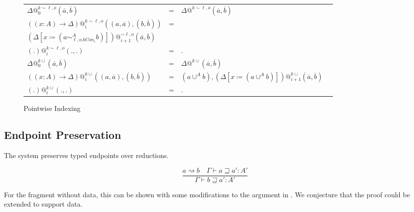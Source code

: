 \begin{figure}
\begin{tabular}{llll}
$\Delta@_{0}^{k\sim\ell,o}\left(\overline{a},\overline{b}\right)$ & = & $\Delta@^{k\sim\ell,o}\left(\overline{a},\overline{b}\right)$ \tabularnewline %
$\left(\left(x:A\right)\rightarrow\Delta\right)@_{i}^{k\sim\ell,o}\left(\left(a,\overline{a}\right),\left(b,\overline{b}\right)\right)$ & = &
\makecell[l]{$\left(a\sim_{\ell,o.TCon_{i}}^{A}b\right),$\\
  $\left(\Delta\left[x\coloneqq\left(a\sim_{\ell,o.kCon_{i}}^{A}b\right)\right]\right)@_{i+1}^{\sim\ell,o}\left(\overline{a},\overline{b}\right)$}
   \tabularnewline %
$\left(.\right)@_{i}^{k\sim\ell,o}\left(.,.\right)$ & = & $.$  \tabularnewline %
$\Delta@_{0}^{k\cup}\left(\overline{a},\overline{b}\right)$ & = & $\Delta@^{k\cup}\left(\overline{a},\overline{b}\right)$  \tabularnewline %
$\left(\left(x:A\right)\rightarrow\Delta\right)@_{i}^{k\cup}\left(\left(a,\overline{a}\right),\left(b,\overline{b}\right)\right)$ & = & $\left(a\cup^{A}b\right),\left(\Delta\left[x\coloneqq\left(a\cup^{A}b\right)\right]\right)@_{i+1}^{k\cup}\left(\overline{a},\overline{b}\right)$ \tabularnewline %
$\left(.\right)@_{i}^{k\cup}\left(.,.\right)$ & = & $.$ \tabularnewline %
\end{tabular}
\caption{Pointwise Indexing}
\label{fig:Pointwise-Applications}
\end{figure}

\subsection{Endpoint Preservation}

The system preserves typed endpoints over reductions.
 
\[
\frac{a\rightsquigarrow b\quad\varGamma\vdash a\sqsupseteq a':A'}{\varGamma\vdash b\sqsupseteq a':A'}
\]
 
For the fragment without data, this can be shown with some modifications to the argument in .
We conjecture that the proof could be extended to support data.

